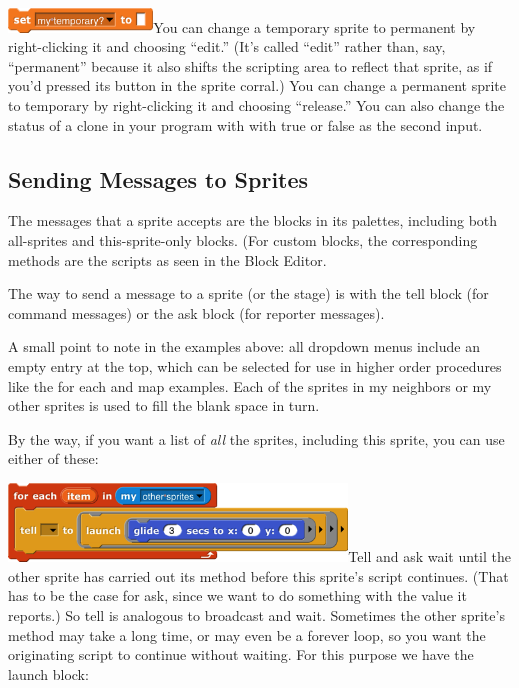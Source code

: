 \includegraphics[width=1.51389in,height=0.25694in]{media/image749.png}You
can change a temporary sprite to permanent by right-clicking it and
choosing ``edit.'' (It's called ``edit'' rather than, say, ``permanent''
because it also shifts the scripting area to reflect that sprite, as if
you'd pressed its button in the sprite corral.) You can change a
permanent sprite to temporary by right-clicking it and choosing
``release.'' You can also change the status of a clone in your program
with with true or false as the second input.

\subsection{\texorpdfstring{ Sending Messages to
Sprites}{ Sending Messages to Sprites}}\label{sending-messages-to-sprites}

The messages that a sprite accepts are the blocks in its palettes,
including both all-sprites and this-sprite-only blocks. (For custom
blocks, the corresponding methods are the scripts as seen in the Block
Editor.

The way to send a message to a sprite (or the stage) is with the tell
block (for command messages) or the ask block (for reporter messages).

A small point to note in the examples above: all dropdown menus include
an empty entry at the top, which can be selected for use in higher order
procedures like the for each and map examples. Each of the sprites in my
neighbors or my other sprites is used to fill the blank space in turn.

By the way, if you want a list of \emph{all} the sprites, including this
sprite, you can use either of these:

\includegraphics[width=3.54514in,height=0.82639in]{media/image762.png}Tell
and ask wait until the other sprite has carried out its method before
this sprite's script continues. (That has to be the case for ask, since
we want to do something with the value it reports.) So tell is analogous
to broadcast and wait. Sometimes the other sprite's method may take a
long time, or may even be a forever loop, so you want the originating
script to continue without waiting. For this purpose we have the launch
block:

